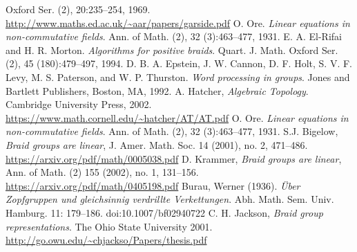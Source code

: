 \documentclass[TFG.tex]{subfiles}
\begin{document}
\begin{thebibliography}{}
Oxford Ser. (2), 20:235–254, 1969. \url{http://www.maths.ed.ac.uk/~aar/papers/garside.pdf}
 O. Ore. \emph{Linear equations in non-commutative fields}. Ann. of Math.
(2), 32 (3):463–477, 1931.
E. A. El-Rifai and H. R. Morton. \emph{Algorithms for positive braids}.
Quart. J. Math. Oxford Ser. (2), 45 (180):479–497, 1994.
 D. B. A. Epstein, J. W. Cannon, D. F. Holt, S. V. F. Levy, M. S.
Paterson, and W. P. Thurston. \emph{Word processing in groups}. Jones and
Bartlett Publishers, Boston, MA, 1992.
 A. Hatcher, \emph{Algebraic Topology}. Cambridge University Press, 2002. \url{https://www.math.cornell.edu/~hatcher/AT/AT.pdf}
 O. Ore. \emph{Linear equations in non-commutative fields}. Ann. of Math.
(2), 32 (3):463–477, 1931.
 S.J. Bigelow, \emph{Braid groups are linear}, J. Amer. Math. Soc. 14 (2001), no. 2,
471–486. \url{https://arxiv.org/pdf/math/0005038.pdf}
 D. Krammer, \emph{Braid groups are linear}, Ann. of Math. (2) 155 (2002), no. 1,
131–156. \url{https://arxiv.org/pdf/math/0405198.pdf}
 Burau, Werner (1936). \emph{Über Zopfgruppen und gleichsinnig verdrillte Verkettungen}. Abh. Math. Sem. Univ. Hamburg. 11: 179–186. doi:10.1007/bf02940722
 C. H. Jackson, \emph{Braid group representations}. The Ohio State University
2001. \url{http://go.owu.edu/~chjackso/Papers/thesis.pdf}
\end{thebibliography}
\end{document}
